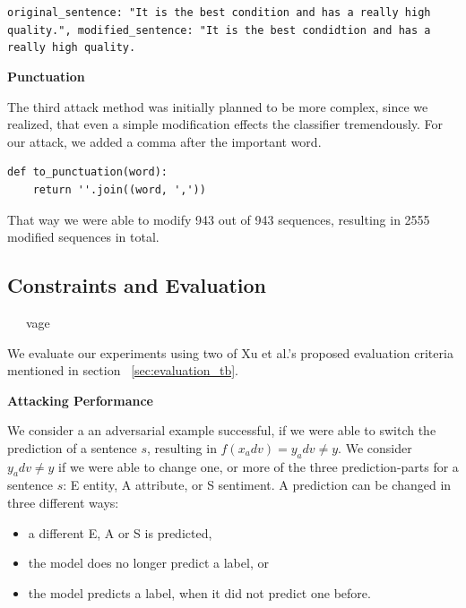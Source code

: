 \texttt{original\_sentence: "It is the best condition and has a really high quality.",
modified\_sentence: "It is the best condidtion and has a really high quality.}


\textbf{Punctuation}

The third attack method was initially planned to be more complex, since we realized, that even a simple modification effects the classifier tremendously. For our attack, we added a comma after the important word. 

\begin{lstlisting}
def to_punctuation(word):
    return ''.join((word, ','))
\end{lstlisting}

That way we were able to modify 943 out of 943 sequences, resulting in 2555 modified sequences in total. 

\subsection{Constraints and Evaluation}
    \label{sec:constraints_m}
~~~vage~~

We evaluate our experiments using two of Xu et al.'s proposed evaluation criteria mentioned in section ~\ref{sec:evaluation_tb}. 

\textbf{Attacking Performance}

We consider a an adversarial example successful, if we were able to switch the prediction of a sentence $s$, resulting in ${f(x_adv ) = y_adv \neq y}$.
We consider ${y_adv \neq y}$ if we were able to change one, or more of the three prediction-parts for a sentence $s$: E entity, A attribute, or S sentiment. 
A prediction can be changed in three different ways:
\begin{itemize}
\item a different E, A or S is predicted,
\item the model does no longer predict a label, or
\item the model predicts a label, when it did not predict one before.
\end{itemize}


